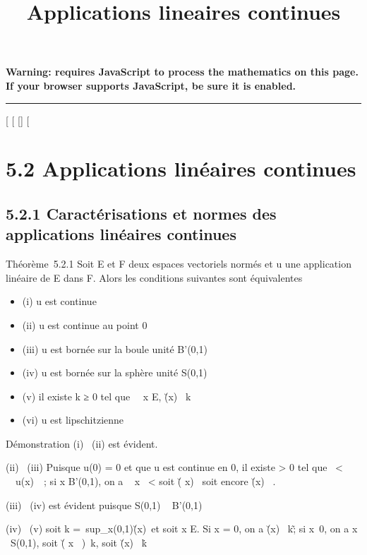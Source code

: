 \documentclass[]{article}
\title{Applications lineaires continues}
\author{}
\date{}
\begin{document}
\maketitle

\textbf{Warning: 
requires JavaScript to process the mathematics on this page.\\ If your
browser supports JavaScript, be sure it is enabled.}

\begin{center}\rule{3in}{0.4pt}\end{center}

[
[
[]
[

\section{5.2 Applications linéaires continues}

\subsection{5.2.1 Caractérisations et normes des applications linéaires
continues}

Théorème~5.2.1 Soit E et F deux espaces vectoriels normés et u une
application linéaire de E dans F. Alors les conditions suivantes sont
équivalentes

\begin{itemize}
\itemsep1pt\parskip0pt
\item
  (i) u est continue
\item
  (ii) u est continue au point 0
\item
  (iii) u est bornée sur la boule unité B'(0,1)
\item
  (iv) u est bornée sur la sphère unité S(0,1)
\item
  (v) il existe k ≥ 0 tel que \forall~~x \in E,
  \u(x)\ \leq
  k\x\
\item
  (vi) u est lipschitzienne
\end{itemize}

Démonstration (i) \rigtharrow~(ii) est évident.

(ii) \rigtharrow~(iii) Puisque u(0) = 0 et que u est continue en 0, il existe \eta
> 0 tel que
\x\ < \eta
\rigtharrow~\ u(x)\ ~; si x \in
B'(0,1), on a \ \eta {}
x\ \leq \eta {} < \eta
soit \u( \eta \over 2
x)\  soit encore
\u(x)\ 
\over \eta .

(iii) \rigtharrow~(iv) est évident puisque S(0,1) \subset~ B'(0,1)

(iv) \rigtharrow~(v) soit k =\
sup_x\inS(0,1)\u(x)\
et soit x \in E. Si x = 0, on a
\u(x)\ \leq
k\x\~; si
x\neq~0, on a  x \over
\x\ \in S(0,1), soit
\u( x \over
\x\
)\ \leq k, soit
\u(x)\ \leq
k\x\.
\end{document}
